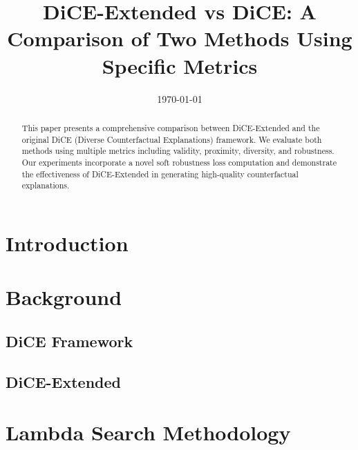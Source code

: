 \documentclass{article}
\title{DiCE-Extended vs DiCE: A Comparison of Two Methods Using Specific Metrics}
\author{}
\date{\today}
\begin{document}
\maketitle

\begin{abstract}
This paper presents a comprehensive comparison between DiCE-Extended and the original DiCE (Diverse Counterfactual Explanations) framework. We evaluate both methods using multiple metrics including validity, proximity, diversity, and robustness. Our experiments incorporate a novel soft robustness loss computation and demonstrate the effectiveness of DiCE-Extended in generating high-quality counterfactual explanations.
\end{abstract}

\tableofcontents
\newpage

\section{Introduction}
\label{sec:introduction}


\section{Background}
\label{sec:background}

\subsection{DiCE Framework}
\label{subsec:dice-framework}


\subsection{DiCE-Extended}
\label{subsec:dice-extended}


\section{Lambda Search Methodology}
\label{sec:lambda-search}
\end{document}
